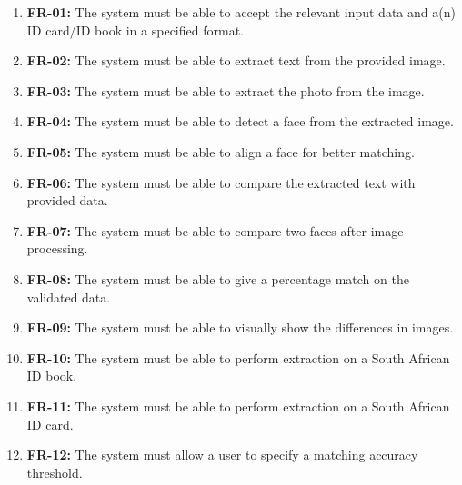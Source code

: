 \documentclass{article}
\begin{document}
		\begin{enumerate}
		    \item \textbf{FR-01:} The system must be able to accept the relevant input data and a(n) ID card/ID book in a specified format.
		    \item \textbf{FR-02:} The system must be able to extract text from the provided image.
		    \item \textbf{FR-03:} The system must be able to extract the photo from the image.
		    \item \textbf{FR-04:} The system must be able to detect a face from the extracted image.
		    \item \textbf{FR-05:} The system must be able to align a face for better matching.
		    \item \textbf{FR-06:} The system must be able to compare the extracted text with provided data.
		    \item \textbf{FR-07:} The system must be able to compare two faces after image processing.
		    \item \textbf{FR-08:} The system must be able to give a percentage match on the validated data.
		    \item \textbf{FR-09:} The system must be able to visually show the differences in images.
		    \item \textbf{FR-10:} The system must be able to perform extraction on a South African ID book.
		    \item \textbf{FR-11:} The system must be able to perform extraction on a South African ID card.
		    \item \textbf{FR-12:} The system must allow a user to specify a matching accuracy threshold.
		    
		\end{enumerate}
		
\end{document}
